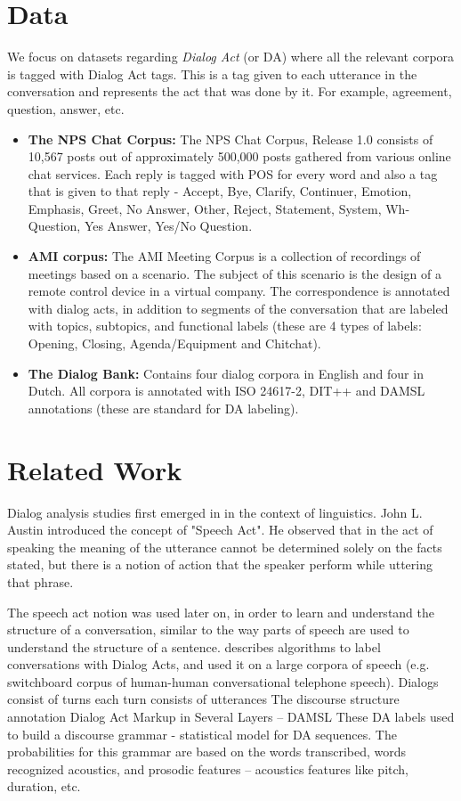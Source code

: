 \section{Data}
We focus on datasets regarding {\em Dialog Act} (or DA) where all the relevant corpora is tagged with Dialog Act tags. 
This is a tag given to each utterance in the conversation and represents the act that was done by it. 
For example, agreement, question, answer, etc.

\begin{itemize}
	\item {\bf The NPS Chat Corpus:} The NPS Chat Corpus, Release 1.0 consists of 10,567 posts 
	out of approximately 500,000 posts gathered from various online chat services.
	Each reply is tagged with POS for every word and also a tag that is given to that reply - Accept, Bye, Clarify, Continuer, Emotion, Emphasis, Greet, No Answer, Other, Reject, Statement, System, Wh-Question, Yes Answer, Yes/No Question.
	\item {\bf AMI corpus:} The AMI Meeting Corpus is a collection of recordings of meetings based on a scenario. 
	The subject of this scenario is the design of a remote control device in a virtual company.
	The correspondence is annotated with dialog acts, in addition to segments of the conversation that are labeled with topics, 
	subtopics, and functional labels (these are 4 types of labels: Opening, Closing, Agenda/Equipment and Chitchat).
	\item {\bf The Dialog Bank:} Contains four dialog corpora in English and four in Dutch. 
	All corpora is annotated with ISO 24617-2, DIT++ and DAMSL annotations (these are standard for DA labeling).
\end{itemize}

\section{Related Work}
Dialog analysis studies first emerged in in the context of linguistics.
John L. Austin introduced the concept of "Speech Act". He observed that in the act of speaking 
the meaning of the utterance cannot be determined solely on the facts stated, 
but there is a notion of action that the speaker perform while uttering that phrase.

The speech act notion was used later on, in order to learn and understand the structure of a conversation, similar to the way parts of speech are used to understand the structure of a sentence. \cite{cs-CL-0006023} describes algorithms to label conversations with Dialog Acts, and used it on a large corpora of speech (e.g. switchboard corpus of human-human conversational telephone speech). 
Dialogs consist of turns each turn consists of utterances
The discourse structure annotation Dialog Act Markup in Several Layers – DAMSL
These DA labels used to build a discourse grammar - statistical model for DA sequences.
The probabilities for this grammar are based on the words transcribed, words recognized acoustics, 
and prosodic features – acoustics features like pitch, duration, etc.

